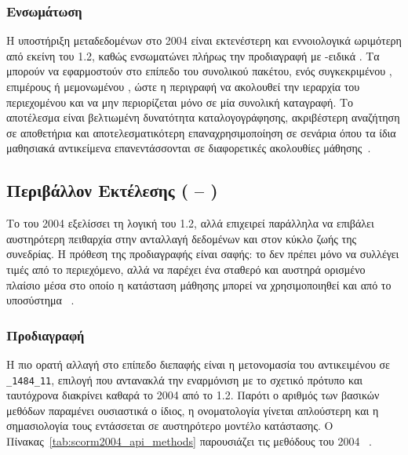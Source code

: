 \subsubsection{Ενσωμάτωση }

Η υποστήριξη μεταδεδομένων στο  2004 είναι εκτενέστερη και εννοιολογικά ωριμότερη από εκείνη του  1.2, καθώς ενσωματώνει πλήρως την προδιαγραφή  με -ειδικά . Τα  μπορούν να εφαρμοστούν στο επίπεδο του συνολικού πακέτου, ενός συγκεκριμένου , επιμέρους  ή μεμονωμένου , ώστε η περιγραφή να ακολουθεί την ιεραρχία του περιεχομένου και να μην περιορίζεται μόνο σε μία συνολική καταγραφή. Το αποτέλεσμα είναι βελτιωμένη δυνατότητα καταλογογράφησης, ακριβέστερη αναζήτηση σε αποθετήρια και αποτελεσματικότερη επαναχρησιμοποίηση σε σενάρια όπου τα ίδια μαθησιακά αντικείμενα επανεντάσσονται σε διαφορετικές ακολουθίες μάθησης~\cite{IEEE_LOM_2020, ADL_SCORM2004_CAM}.

\subsection{Περιβάλλον Εκτέλεσης ( -- )}
\label{subsec:scorm2004_rte}

Το  του  2004 εξελίσσει τη λογική του  1.2, αλλά επιχειρεί παράλληλα να επιβάλει αυστηρότερη πειθαρχία στην ανταλλαγή δεδομένων και στον κύκλο ζωής της συνεδρίας. Η πρόθεση της προδιαγραφής είναι σαφής: το  δεν πρέπει μόνο να συλλέγει τιμές από το περιεχόμενο, αλλά να παρέχει ένα σταθερό και αυστηρά ορισμένο πλαίσιο μέσα στο οποίο η κατάσταση μάθησης μπορεί να χρησιμοποιηθεί και από το υποσύστημα ~\cite{ADL_SCORM2004_RTE, ADL_SCORM_Users_Guide}.

\subsubsection{Προδιαγραφή }

Η πιο ορατή αλλαγή στο επίπεδο διεπαφής είναι η μετονομασία του αντικειμένου  σε \texttt{\_1484\_11}, επιλογή που αντανακλά την εναρμόνιση με το σχετικό  πρότυπο και ταυτόχρονα διακρίνει καθαρά το  2004 από το  1.2. Παρότι ο αριθμός των βασικών μεθόδων παραμένει ουσιαστικά ο ίδιος, η ονοματολογία γίνεται απλούστερη και η σημασιολογία τους εντάσσεται σε αυστηρότερο μοντέλο κατάστασης. Ο Πίνακας~\ref{tab:scorm2004_api_methods} παρουσιάζει τις μεθόδους του  2004 ~\cite{IEEE_ECMAScript_API, ADL_SCORM2004_RTE}.

